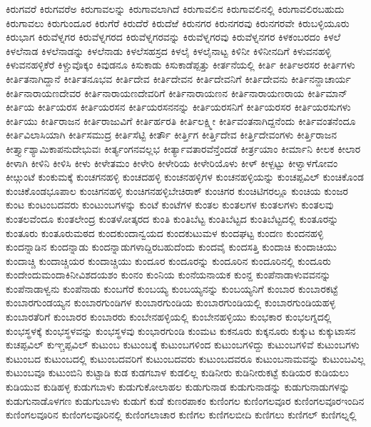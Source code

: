 {ಕಿರುಗವರೆ
ಕಿರುಗವರೆಅ
ಕಿರುಗಾವಲನ್ನು
ಕಿರುಗಾವಲಾಗಿದೆ
ಕಿರುಗಾವಲಿನ
ಕಿರುಗಾವಲಿನಲ್ಲಿ
ಕಿರುಗಾವಲಿರಬಹುದು
ಕಿರುಗಾವಲು
ಕಿರುಗುಂದೂರ
ಕಿರುಗೆರೆ
ಕಿರುದೆರೆ
ಕಿರುದೆಱೆ
ಕಿರುನಗರ
ಕಿರುನಗರವು
ಕಿರುನಗರವೇ
ಕಿರುಬಳ್ಳಿಯೂರು
ಕಿರುಭಾಗ
ಕಿರುವೆಳ್ನಗರ
ಕಿರುವೆಳ್ನಗರದ
ಕಿರುವೆಳ್ನಗರವನ್ನು
ಕಿರುವೆಳ್ನಗರವು
ಕಿರುವೆಳ್ನನಗರ
ಕಿಳಕಂಬರದಂ
ಕಿಳಲೆ
ಕಿಳಲೆನಾಡ
ಕಿಳಲೆನಾಡನ್ನು
ಕಿಳಲೆನಾಡು
ಕಿಳಲೆಸಹಸ್ರದ
ಕಿಳಲೈ
ಕಿಳಲೈನಾಟ್ಟ
ಕಿಳಿನೀ
ಕಿಳಿನೀನದಿಗೆ
ಕಿಳುವನಹಳ್ಳಿ
ಕಿಳುವನಹಳ್ಳಿಕೆರೆ
ಕಿಳ್ಚುವೊಕ್ಕಂ
ಕಿವುಡನೂ
ಕಿಸುಕಾಡು
ಕಿಸುಕಾಡೆಪ್ಪತ್ತು
ಕೀರ್ತನೆಯಲ್ಲಿ
ಕೀರ್ತಿ
ಕೀರ್ತಿಅರಸರ
ಕೀರ್ತಿಗಳು
ಕೀರ್ತಿತನಾಗಿದ್ದಾನೆ
ಕೀರ್ತಿತನೂಭವ
ಕೀರ್ತಿದೇವ
ಕೀರ್ತಿದೇವನ
ಕೀರ್ತಿದೇವನಿಗೆ
ಕೀರ್ತಿದೇವನು
ಕೀರ್ತಿನನ್ದಾಚಾರ್ಯ
ಕೀರ್ತಿನಾರಾಯಣದೇವರ
ಕೀರ್ತಿನಾರಾಯಣದೇವರಿಗೆ
ಕೀರ್ತಿನಾರಾಯಣನ
ಕೀರ್ತಿನಾರಾಯಣರಾಯ
ಕೀರ್ತಿಮಾನ್
ಕೀರ್ತಿಯ
ಕೀರ್ತಿಯರಸ
ಕೀರ್ತಿಯರಸನ
ಕೀರ್ತಿಯರಸನನನ್ನು
ಕೀರ್ತಿಯರಸನಿಗೆ
ಕೀರ್ತಿಯರಸರ
ಕೀರ್ತಿಯರಸುಗಳು
ಕೀರ್ತಿಯು
ಕೀರ್ತಿರಾಜನ
ಕೀರ್ತಿರಾಜುವಿಗೆ
ಕೀರ್ತಿರ್ಹರತಿ
ಕೀರ್ತಿಲಕ್ಷ್ಮೀ
ಕೀರ್ತಿವಂತನಾಗಿದ್ದನೆಂದು
ಕೀರ್ತಿವಂತನೆಂದೂ
ಕೀರ್ತಿವಿಲಾಸಿಯಾಗಿ
ಕೀರ್ತಿಸಮುದ್ರ
ಕೀರ್ತಿಸೆಟ್ಟಿ
ಕೀರ್ತೌ
ಕೀರ್ತ್ತಿಗ
ಕೀರ್ತ್ತಿದೇವ
ಕೀರ್ತ್ತಿದೇವಂಗಳು
ಕೀರ್ತ್ತಿರಾಜನ
ಕೀರ್ತ್ತ್ಯಾಶ್ಯಾಮಿಕಾಪನುದೇಭುವಃ
ಕೀರ್ತ್ಯಂಗನವಲ್ಲಭ
ಕೀರ್ತ್ಯಾವತಾರವೆನ್ತೆಂದಡೆ
ಕೀರ್ತ್ರಯಾಂ
ಕೀರ್ಮಾನಿ
ಕೀಲಕ
ಕೀಲಾರ
ಕೀಳಾಗಿ
ಕೀಳಿನಿ
ಕೀಳಿಸಿ
ಕೀಳು
ಕೀಳೇತಮಂ
ಕೀಳೇರಿ
ಕೀಳೇರಿಯ
ಕೀಳೇರಿಯೊಳು
ಕೀಳ್
ಕೀಳ್ಪಟ್ಟು
ಕೀಳ್ವಾಳಗೋವಂ
ಕೀೞ್ಗುಂಟೆ
ಕುಂಕುಮಕ್ಕೆ
ಕುಂಚಗನಹಳ್ಳಿ
ಕುಂಚದಹಳ್ಳಿ
ಕುಂಚನಹಳ್ಳಿಗಳ
ಕುಂಚನಹಳ್ಳಿಯನ್ನು
ಕುಂಚಪ್ಪವಿಲ್
ಕುಂಚಿಕೊಂಡ
ಕುಂಚಿಕೊಂಡಭೂಪಾಲ
ಕುಂಚಿಗನಹಳ್ಳಿ
ಕುಂಚಿಗನಹಳ್ಳಿಬೇಚಿರಾಕ್
ಕುಂಚಿಗರ
ಕುಂಚಿಟಿಗರಲ್ಲೂ
ಕುಂಚಿಯ
ಕುಂಜರ
ಕುಂಟ
ಕುಂಟಂಬದವರು
ಕುಂಟುಂಬಗಳನ್ನು
ಕುಂಟೆ
ಕುಂಟೆಗಳ
ಕುಂತಲ
ಕುಂತಲಗಳ
ಕುಂತಲಗಳು
ಕುಂತಲವು
ಕುಂತಲವೆಂದೂ
ಕುಂತಲೇಂದ್ರ
ಕುಂತಳೋತ್ಕರದ
ಕುಂತಿ
ಕುಂತಿಬೆಟ್ಟ
ಕುಂತಿಬೆಟ್ಟದ
ಕುಂತಿಬೆಟ್ಟದಲ್ಲಿ
ಕುಂತೂರನ್ನು
ಕುಂತೂರು
ಕುಂತೂರುಮಠದ
ಕುಂದಕುಂದಾನ್ವಯದ
ಕುಂದಕುಟುಮಳ
ಕುಂದಘಟ್ಟ
ಕುಂದಣ
ಕುಂದನಹಳ್ಳಿ
ಕುಂದನ್ನಾಡಿನ
ಕುಂದನ್ನಾಡು
ಕುಂದನ್ನಾಡುಗಳಾದ್ದಿರಬಹುದೆಂದು
ಕುಂದವೈ
ಕುಂದಸತ್ತಿ
ಕುಂದಾಚಿ
ಕುಂದಾಚಿಯು
ಕುಂದಾಚ್ಚಿ
ಕುಂದಾಚ್ಚಿಯರ
ಕುಂದಾಚ್ಚಿಯು
ಕುಂದೂರ
ಕುಂದೂರನ್ನು
ಕುಂದೂರಿನ
ಕುಂದೂರಿನಲ್ಲಿ
ಕುಂದೂರು
ಕುಂದೇಂದುಮಂದಾಕಿನೀವಿಶದಯಶಂ
ಕುಂನಂ
ಕುಂನಿಯ
ಕುಂನೆಯನಾಯಕ
ಕುಂನ್ದ
ಕುಂಪೆನಾಡಾಳುವವನನ್ನು
ಕುಂಪೆನಾಡಾಳ್ವನು
ಕುಂಪೆನಾಡು
ಕುಂಬಗೆರೆ
ಕುಂಬಯ್ಯ
ಕುಂಬಯ್ಯನನ್ನು
ಕುಂಬಯ್ಯನಿಗೆ
ಕುಂಬಾರ
ಕುಂಬಾರಕಟ್ಟೆ
ಕುಂಬಾರಗುಂಡಯ್ಯನ
ಕುಂಬಾರಗುಂಡಿಗಳ
ಕುಂಬಾರಗುಂಡಿಯ
ಕುಂಬಾರಗುಂಡಿಯಲ್ಲಿ
ಕುಂಬಾರಗುಂಡಿಯಹಳ್ಳ
ಕುಂಬಾರತೆರಿಗೆ
ಕುಂಬಾರರ
ಕುಂಬಾರರು
ಕುಂಬೇನಹಳ್ಳಿಯಲ್ಲಿ
ಕುಂಬೇನಹಳ್ಳಿಯು
ಕುಂಭಕಾರ
ಕುಂಭಲಗ್ನದಲ್ಲಿ
ಕುಂಭಸ್ಥಳಕ್ಕೆ
ಕುಂಭಸ್ಥಳವನ್ನು
ಕುಂಭಸ್ಥಳವು
ಕುಂಭಾರಗುಂಡಿ
ಕುಂಮಟ
ಕುಕನೂರು
ಕುಕ್ಕನೂರು
ಕುಕ್ಕುಟ
ಕುಕ್ಕುಟಾಸನ
ಕುಚಪ್ಪವಿಲ್
ಕುಞ್ಚಪ್ಪವಿಲ್
ಕುಟುಂಬ
ಕುಟುಂಬಕ್ಕೆ
ಕುಟುಂಬಗಳಿಂದ
ಕುಟುಂಬಗಳಿದ್ದು
ಕುಟುಂಬಗಳಿವೆ
ಕುಟುಂಬಗಳು
ಕುಟುಂಬದ
ಕುಟುಂಬದಲ್ಲಿ
ಕುಟುಂಬದವರಿಗೆ
ಕುಟುಂಬದವರು
ಕುಟುಂಬದವರೂ
ಕುಟುಂಬನಾಮವನ್ನು
ಕುಟುಂಬವಿಲ್ಲ
ಕುಟುಂಬವೂ
ಕುಟುಂಬಿನಿ
ಕುಟ್ಟಾಡಿ
ಕುಡ
ಕುಡಗಬಾಳ
ಕುಡಲಿಲ್ಲ
ಕುಡಿನೀರು
ಕುಡಿನೀರುಕಟ್ಟೆ
ಕುಡಿಯರ
ಕುಡಿಯಲು
ಕುಡಿಯುವ
ಕುಡಿಹಳ್ಳ
ಕುಡುಗಬಾಳು
ಕುಡುಗುಕೋಲಾಹಲ
ಕುಡುಗುನಾಡ
ಕುಡುಗುನಾಡನ್ನು
ಕುಡುಗುನಾಡುಗಳನ್ನು
ಕುಡುಗುನಾಡೊಳಗಣ
ಕುಡುಗುಬಾಳು
ಕುಡುಗೆ
ಕುಡೆ
ಕುಣರಪಾಕಂ
ಕುಣಿಂಗಲ
ಕುಣಿಂಗಲವೂರ
ಕುಣಿಂಗಲವೂರಇಂದಿನ
ಕುಣಿಂಗಲವೂರಿನ
ಕುಣಿಂಗಲವೂರಿನಲ್ಲಿ
ಕುಣಿಂಗಲಾಚಾರ
ಕುಣಿಗಲ
ಕುಣಿಗಲಬೀದಿ
ಕುಣಿಗಲು
ಕುಣಿಗಲ್
ಕುಣಿಗಲ್ನಲ್ಲಿ
}
